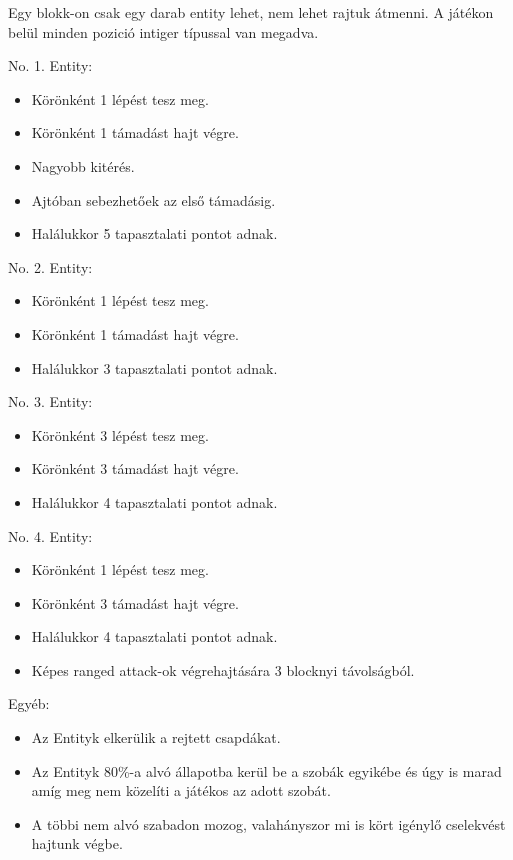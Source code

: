 
Egy blokk-on csak egy darab entity lehet, nem lehet rajtuk átmenni.
A játékon belül minden pozició intiger típussal van megadva.



\noindent No. 1. Entity:
\begin{itemize}
    \item Körönként 1 lépést tesz meg.
    \item Körönként 1 támadást hajt végre.
    \item Nagyobb kitérés.
    \item Ajtóban sebezhetőek az első támadásig.
    \item Halálukkor 5 tapasztalati pontot adnak.
\end{itemize}

\noindent No. 2. Entity:
\begin{itemize}
    \item Körönként 1 lépést tesz meg.
    \item Körönként 1 támadást hajt végre.
    \item Halálukkor 3 tapasztalati pontot adnak.
\end{itemize}

\noindent No. 3. Entity:
\begin{itemize}
    \item Körönként 3 lépést tesz meg.
    \item Körönként 3 támadást hajt végre.
    \item Halálukkor 4 tapasztalati pontot adnak.
\end{itemize}

\noindent No. 4. Entity:
\begin{itemize}
    \item Körönként 1 lépést tesz meg.
    \item Körönként 3 támadást hajt végre.
    \item Halálukkor 4 tapasztalati pontot adnak.
    \item Képes ranged attack-ok végrehajtására 3 blocknyi távolságból.
\end{itemize}

\noindent Egyéb:
\begin{itemize}
    \item Az Entityk elkerülik a rejtett csapdákat.
    \item Az Entityk 80\%-a alvó állapotba kerül be a szobák egyikébe és úgy is marad amíg meg nem közelíti a játékos az adott szobát.
    \item A többi nem alvó szabadon mozog, valahányszor mi is kört igénylő cselekvést hajtunk végbe.
\end{itemize}

